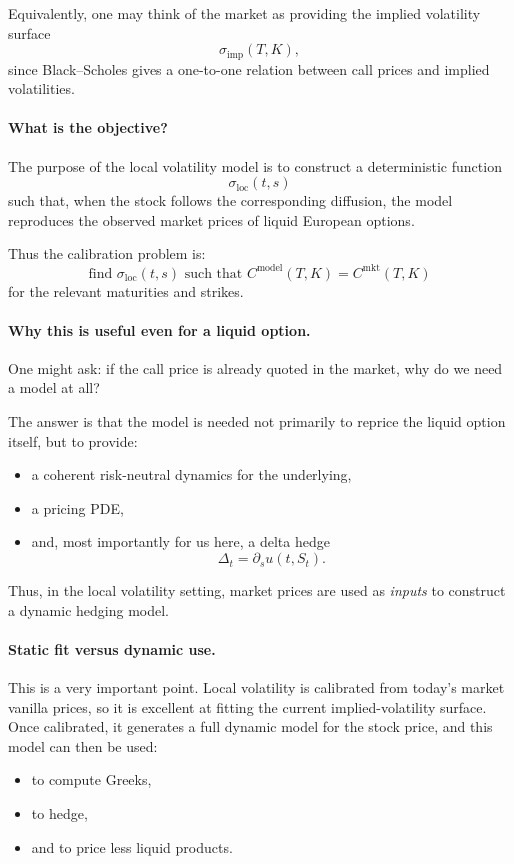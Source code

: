 \documentclass[11pt]{article}
\theoremstyle{plain}
\theoremstyle{definition}
\theoremstyle{remark}
\begin{document}
Equivalently, one may think of the market as providing the implied
volatility surface
\[
\sigma_{\mathrm{imp}}(T,K),
\]
since Black--Scholes gives a one-to-one relation between call prices and
implied volatilities.

\paragraph{What is the objective?}
The purpose of the local volatility model is to construct a deterministic
function
\[
\sigma_{\mathrm{loc}}(t,s)
\]
such that, when the stock follows the corresponding diffusion, the model
reproduces the observed market prices of liquid European options.

Thus the calibration problem is:
\[
\text{find }\sigma_{\mathrm{loc}}(t,s)\text{ such that }
C^{\mathrm{model}}(T,K)=C^{\mathrm{mkt}}(T,K)
\]
for the relevant maturities and strikes.

\paragraph{Why this is useful even for a liquid option.}
One might ask:
if the call price is already quoted in the market, why do we need a
model at all?

The answer is that the model is needed not primarily to reprice the
liquid option itself, but to provide:
\begin{itemize}[leftmargin=1.4em]
    \item a coherent risk-neutral dynamics for the underlying,
    \item a pricing PDE,
    \item and, most importantly for us here, a delta hedge
    \[
    \Delta_t=\partial_s u(t,S_t).
    \]
\end{itemize}

Thus, in the local volatility setting, market prices are used as
\emph{inputs} to construct a dynamic hedging model.

\paragraph{Static fit versus dynamic use.}
This is a very important point.
Local volatility is calibrated from today's market vanilla prices, so it
is excellent at fitting the current implied-volatility surface.
Once calibrated, it generates a full dynamic model for the stock price,
and this model can then be used:
\begin{itemize}[leftmargin=1.4em]
    \item to compute Greeks,
    \item to hedge,
    \item and to price less liquid products.
\end{itemize}
\end{document}
